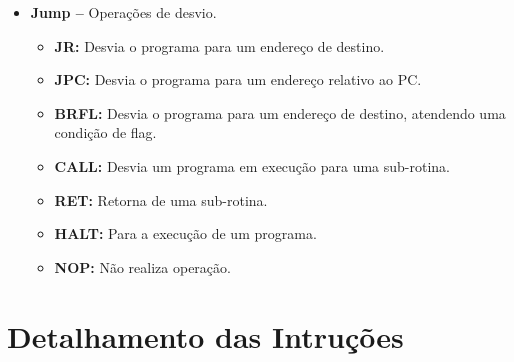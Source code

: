 \documentclass{report}
\begin{document}
\begin{itemize}
    \item \textbf{Jump --} Operações de desvio.\\
    \begin{itemize}
        \item \textbf{JR:} Desvia o programa para um endereço de destino.
        \item \textbf{JPC:} Desvia o programa para um endereço relativo ao PC.
        \item \textbf{BRFL:} Desvia o programa para um endereço de destino, atendendo uma condição de flag.
        \item \textbf{CALL:} Desvia um programa em execução para uma sub-rotina.
        \item \textbf{RET:} Retorna de uma sub-rotina.
        \item \textbf{HALT:} Para a execução de um programa.
        \item \textbf{NOP:} Não realiza operação.
    \end{itemize}
    
    \end{itemize}

  \section{Detalhamento das Intruções}
  
\end{document}
